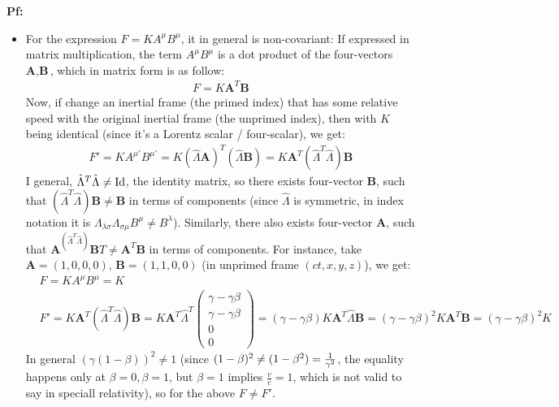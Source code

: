 \documentclass{article}
\newcommand{\Id}{\textmd{Id}} %
\DeclarePairedDelimiter{\paran}{(}{)}%
\begin{document}
\textbf{Pf:}
\begin{itemize}
    \item For the expression $F=KA^\mu B^\mu$, it in general is non-covariant: If expressed in matrix multiplication, the term $A^\mu B^\mu$ is a dot product of the four-vectors $\textbf{A},\textbf{B}$, which in matrix form is as follow:
    \begin{align}
        F = K\textbf{A}^T\textbf{B}
    \end{align}
    Now, if change an inertial frame (the primed index) that has some relative speed with the original inertial frame (the unprimed index), then with $K$ being identical (since it's a Lorentz scalar / four-scalar), we get:
    \begin{align}
        F' = KA^{\mu'}B^{\mu'} = K(\hat{\Lambda}\textbf{A})^T (\hat{\Lambda}\textbf{B}) = K\textbf{A}^T(\hat{\Lambda}^T\hat{\Lambda})\textbf{B}
    \end{align}
    I general, $\hat{\Lambda}^T\hat{\Lambda}\neq \Id$, the identity matrix, so there exists four-vector $\textbf{B}$, such that $(\hat{\Lambda}^T\hat{\Lambda})\textbf{B}\neq \textbf{B}$ in terms of components (since $\hat{\Lambda}$ is symmetric, in index notation it is $\Lambda_{\lambda \sigma}\Lambda_{\sigma\mu}B^\mu \neq B^\lambda$). Similarly, there also exists four-vector $\textbf{A}$, such that $\textbf{A}^(\hat{\Lambda}^T\hat{\Lambda})\textbf{B}T\neq \textbf{A}^T\textbf{B}$ in terms of components. For instance, take $\textbf{A}=(1,0,0,0)$, $\textbf{B}=(1,1,0,0)$ (in unprimed frame $(ct,x,y,z)$), we get:
    \begin{align}
        &F = KA^\mu B^\mu = K\\
        &F' = K\textbf{A}^T(\hat{\Lambda}^T\hat{\Lambda})\textbf{B} = K\textbf{A}^T\hat{\Lambda}^T\begin{pmatrix}
            \gamma - \gamma\beta \\ \gamma - \gamma\beta \\ 0 \\ 0
        \end{pmatrix} = (\gamma-\gamma\beta)K\textbf{A}^T\hat{\Lambda}\textbf{B} = (\gamma-\gamma\beta)^2K\textbf{A}^T\textbf{B} = (\gamma-\gamma\beta)^2K
    \end{align}
    In general $(\gamma(1-\beta))^2\neq 1$ (since $(1-\beta)^2 \neq \paran{1-\beta^2}=\frac{1}{\gamma^2}$, the equality happens only at $\beta=0, \beta=1$, but $\beta=1$ implies $\frac{v}{c}=1$, which is not valid to say in speciall relativity), so for the above $F\neq F'$.


\end{itemize}
\end{document}
